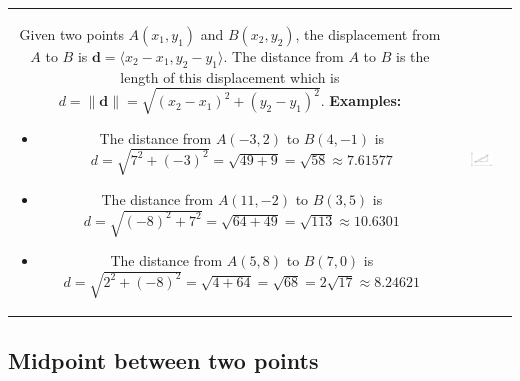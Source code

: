 \documentclass{article}
\begin{document}
\begin{tabular}{cc}
\parbox{0.5\textwidth}{
Given two points \(A(x_1, y_1)\) and \(B(x_2, y_2)\), the displacement from \(A\) to \(B\) is \(\mathbf{d} = \langle x_2 - x_1, y_2 - y_1 \rangle\). The distance from \(A\) to \(B\) is the length of this displacement which is \(d = \|\mathbf{d}\| = \sqrt{(x_2 - x_1)^2 + (y_2 - y_1)^2}\). \\
\textbf{Examples:}
\begin{itemize}
\item The distance from \(A(-3,2)\) to \(B(4,-1)\) is \(d = \sqrt{7^2 + (-3)^2} = \sqrt{49 + 9} = \sqrt{58} \approx 7.61577\)
\item The distance from \(A(11,-2)\) to \(B(3,5)\) is \(d = \sqrt{(-8)^2 + 7^2} = \sqrt{64 + 49} = \sqrt{113} \approx 10.6301\)
\item The distance from \(A(5,8)\) to \(B(7,0)\) is \(d = \sqrt{2^2 + (-8)^2} = \sqrt{4 + 64} = \sqrt{68} = 2\sqrt{17} \approx 8.24621\)
\end{itemize}
}
& \parbox{0.5\textwidth}{
\includegraphics[width = 0.5\textwidth]{distance_between_points}
}
\end{tabular}


\subsection*{Midpoint between two points}
\end{document}

